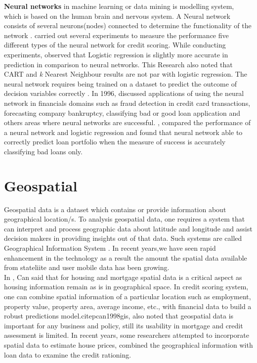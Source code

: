 {\textbf{Neural networks} in machine learning or data mining is modelling system, which is based on the human brain and nervous system. A Neural network consists of several neurons(nodes) connected to determine the functionality of the network \citep{demuth2008neural}. \citet{west2000neural} carried out several experiments to measure the performance five different types of the neural network for credit scoring. While conducting experiments, \citet{west2000neural} observed that Logistic regression is slightly more accurate in prediction in comparison to neural networks. This Research also noted that CART and \emph{k} Nearest Neighbour results are not par with logistic regression. The neural network requires being trained on a dataset to predict the outcome of decision variables correctly \citep{presky1996functional}. In 1996, \cite{gately1995neural} discussed applications of using the neural network in financials domains such as fraud detection in credit card transactions, forecasting company bankruptcy, classifying bad or good loan application and others areas where neural networks are successful\citep{ghosh1994credit}. \citet{desai1996comparison}, compared the performance of a neural network and logistic regression and found that neural network able to correctly predict loan portfolio when the measure of success is accurately classifying bad loans only.

\section{Geospatial}

Geospatial data is a dataset which contains or provide information about geographical location/s. To analysis geospatial data, one requires a system that can interpret and process geographic data about latitude and longitude and assist decision makers in providing insights out of that data. Such systems are called Geographical Information System \citep{keenan1998spatial}. In recent years,we have seen rapid enhancement in the technology as a result the amount the spatial data available from stateliite and user mobile data has been growing.\\

In \citep{can1998gis}, Can said that for housing and mortgage spatial data is a critical aspect as housing information remain as is in geographical space. In credit scoring system, one can combine spatial information of a particular location such as employment, property value, property area, average income, etc., with financial data to build a robust predictions model.citep{can1998gis}, also noted that geospatial data is important for any business and policy, still its usability in mortgage and credit assessment is limited. In recent years, some researchers attempted to incorporate spatial data to estimate house prices\citep{tse2002estimating}, \citet{carling2005asymmetric} combined the geographical information with loan data to examine the credit rationing.\\

}
